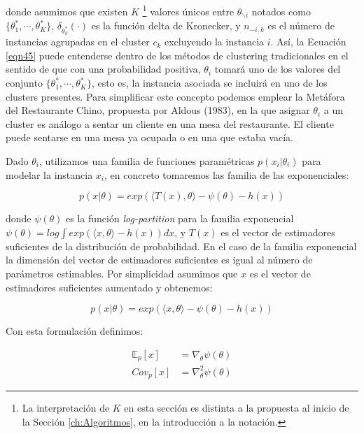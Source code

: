 donde asumimos que existen $K$ \footnote{La interpretación de $K$ en esta sección es distinta a la propuesta al inicio de la Sección \ref{ch:Algoritmos}, en la introducción a la notación.} valores únicos entre $\theta_{\backslash i}$ notados como $\{\theta_{1}^*, \cdots, \theta_{K}^*\}$, $\delta_{\theta_{k}^*}(\cdot)$ es la función delta de Kronecker, y $n_{-i,k}$ es el número de instancias agrupadas en el cluster $c_k$ excluyendo la instancia $i$. Así, la Ecuación \ref{eqn45} puede entenderse dentro de los métodos de clustering tradicionales en el sentido de que con una probabilidad positiva, $\theta_i$ tomará uno de los valores del conjunto $\{\theta_{1}^*, \cdots, \theta_{K}^*\}$, esto es, la instancia asociada se incluirá en uno de los clusters presentes. Para simplificar este concepto podemos emplear la Metáfora del Restaurante Chino, propuesta por Aldous (1983), en la que asignar $\theta_i$ a un cluster es análogo a sentar un cliente en una mesa del restaurante. El cliente puede sentarse en una mesa ya ocupada o en una que estaba vacía.

Dado $\theta_i$, utilizamos una familia de funciones paramétricas $p(x_i|\theta_i)$ para modelar la instancia $x_i$, en concreto tomaremos las familia de las exponenciales:

\begin{equation}
p(x|\theta) = exp(\langle T(x), \theta \rangle - \psi(\theta) - h(x))
\label{eqn46}
\end{equation}

donde $\psi(\theta)$ es la función \textit{log-partition} para la familia exponencial $\psi(\theta) = log \int exp(\langle x, \theta \rangle - h(x))dx$, y $T(x)$ es el vector de estimadores suficientes de la distribución de probabilidad. En el caso de la familia exponencial la dimensión del vector de estimadores suficientes es igual al número de parámetros estimables. Por simplicidad asumimos que $x$ es el vector de estimadores suficientes aumentado y obtenemos:

\begin{equation}
p(x|\theta) = exp(\langle x, \theta \rangle - \psi(\theta) - h(x))
\label{eqn47}
\end{equation}

Con esta formulación definimos:

\begin{equation}
\begin{split}
\mathbb{E}_p[x] &= \nabla_{\theta} \psi(\theta) \\
Cov_p[x] &= \nabla_{\theta}^2 \psi(\theta)
\end{split}
\label{eqn48}
\end{equation}

